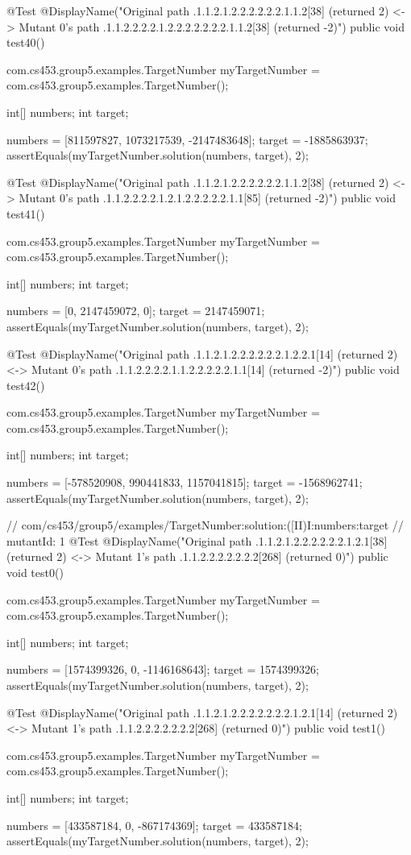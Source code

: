 @Test
@DisplayName("Original path .1.1.2.1.2.2.2.2.2.2.1.1.2[38] (returned 2) <-> Mutant 0's path .1.1.2.2.2.2.1.2.2.2.2.2.2.2.1.1.2[38] (returned -2)")
public void test40() {
    com.cs453.group5.examples.TargetNumber myTargetNumber = com.cs453.group5.examples.TargetNumber();

    int[] numbers;
    int target;

    numbers = [811597827, 1073217539, -2147483648];
    target = -1885863937;
    assertEquals(myTargetNumber.solution(numbers, target), 2);
}

@Test
@DisplayName("Original path .1.1.2.1.2.2.2.2.2.2.1.1.2[38] (returned 2) <-> Mutant 0's path .1.1.2.2.2.2.1.2.1.2.2.2.2.2.1.1[85] (returned -2)")
public void test41() {
    com.cs453.group5.examples.TargetNumber myTargetNumber = com.cs453.group5.examples.TargetNumber();

    int[] numbers;
    int target;

    numbers = [0, 2147459072, 0];
    target = 2147459071;
    assertEquals(myTargetNumber.solution(numbers, target), 2);
}

@Test
@DisplayName("Original path .1.1.2.1.2.2.2.2.2.2.1.2.2.1[14] (returned 2) <-> Mutant 0's path .1.1.2.2.2.2.1.1.2.2.2.2.2.1.1[14] (returned -2)")
public void test42() {
    com.cs453.group5.examples.TargetNumber myTargetNumber = com.cs453.group5.examples.TargetNumber();

    int[] numbers;
    int target;

    numbers = [-578520908, 990441833, 1157041815];
    target = -1568962741;
    assertEquals(myTargetNumber.solution(numbers, target), 2);
}

// com/cs453/group5/examples/TargetNumber:solution:([II)I:numbers:target
// mutantId: 1
@Test
@DisplayName("Original path .1.1.2.1.2.2.2.2.2.2.1.2.1[38] (returned 2) <-> Mutant 1's path .1.1.2.2.2.2.2.2.2[268] (returned 0)")
public void test0() {
    com.cs453.group5.examples.TargetNumber myTargetNumber = com.cs453.group5.examples.TargetNumber();

    int[] numbers;
    int target;

    numbers = [1574399326, 0, -1146168643];
    target = 1574399326;
    assertEquals(myTargetNumber.solution(numbers, target), 2);
}

@Test
@DisplayName("Original path .1.1.2.1.2.2.2.2.2.2.2.1.2.1[14] (returned 2) <-> Mutant 1's path .1.1.2.2.2.2.2.2.2[268] (returned 0)")
public void test1() {
    com.cs453.group5.examples.TargetNumber myTargetNumber = com.cs453.group5.examples.TargetNumber();

    int[] numbers;
    int target;

    numbers = [433587184, 0, -867174369];
    target = 433587184;
    assertEquals(myTargetNumber.solution(numbers, target), 2);
}

